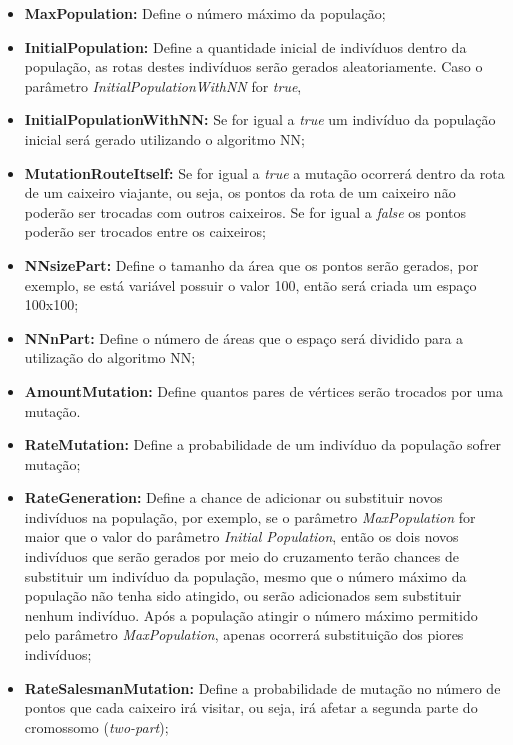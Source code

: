 \documentclass[12pt,openright,a4paper,twoside]{tcc}
\begin{document}
            \begin{itemize}
                \item \textbf{MaxPopulation:} Define o número máximo da população; 
                \item \textbf{InitialPopulation:} Define a quantidade inicial de indivíduos dentro da população, as rotas destes indivíduos serão gerados aleatoriamente. Caso o parâmetro \textit{InitialPopulationWithNN} for \textit{true}, 
                \item \textbf{InitialPopulationWithNN:} Se for igual a \textit{true} um indivíduo da população inicial será gerado utilizando o algoritmo NN;
                \item \textbf{MutationRouteItself:} Se for igual a \textit{true} a mutação ocorrerá dentro da rota de um caixeiro viajante, ou seja, os pontos da rota de um caixeiro não poderão ser trocadas com outros caixeiros. Se for igual a \textit{false} os pontos poderão ser trocados entre os caixeiros;
                \item \textbf{NNsizePart:} Define o tamanho da área que os pontos serão gerados, por exemplo, se está variável possuir o valor 100, então será criada um espaço 100x100;
                \item \textbf{NNnPart:} Define o número de áreas que o espaço será dividido para a utilização do algoritmo NN;
                \item \textbf{AmountMutation:} Define quantos pares de vértices serão trocados por uma mutação.
                \item \textbf{RateMutation:} Define a probabilidade de um indivíduo da população sofrer mutação;
                \item \textbf{RateGeneration:} Define a chance de adicionar ou substituir novos indivíduos na população, por exemplo, se o parâmetro \textit{MaxPopulation} for maior que o valor do parâmetro \textit{Initial Population}, então os dois novos indivíduos que serão gerados por meio do cruzamento terão chances de substituir um indivíduo da população, mesmo que o número máximo da população não tenha sido atingido, ou serão adicionados sem substituir nenhum indivíduo. Após a população atingir o número máximo permitido pelo parâmetro \textit{MaxPopulation}, apenas ocorrerá substituição dos piores indivíduos;
                \item \textbf{RateSalesmanMutation:} Define a probabilidade de mutação no número de pontos que cada caixeiro irá visitar, ou seja, irá afetar a segunda parte do cromossomo (\textit{two-part});

\end{itemize}
\end{document}
